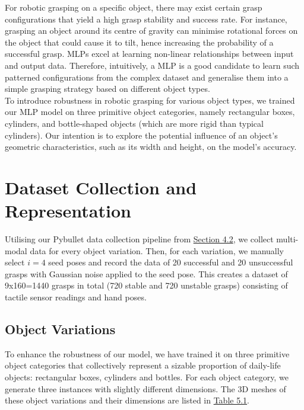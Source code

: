 \documentclass[11pt, a4paper]{report}
\begin{document}
For robotic grasping on a specific object, there may exist certain grasp configurations that yield a high grasp stability and success rate. For instance, grasping an object around its centre of gravity can minimise rotational forces on the object that could cause it to tilt, hence increasing the probability of a successful grasp. MLPs excel at learning non-linear relationships between input and output data. Therefore, intuitively, a MLP is a good candidate to learn such patterned configurations from the complex dataset and generalise them into a simple grasping strategy based on different object types.\\

To introduce robustness in robotic grasping for various object types, we trained our MLP model on three primitive object categories, namely rectangular boxes, cylinders, and bottle-shaped objects (which are more rigid than typical cylinders). Our intention is to explore the potential influence of an object's geometric characteristics, such as its width and height, on the model's accuracy.


\section{Dataset Collection and Representation}
\label{sec:5.2}
Utilising our Pybullet data collection pipeline from \hyperref[sec:4.2]{Section 4.2}, we collect multi-modal data for every object variation. Then, for each variation, we manually select $i=4$ seed poses and record the data of 20 successful and 20 unsuccessful grasps with Gaussian noise applied to the seed pose. This creates a dataset of 9x160=1440 grasps in total (720 stable and 720 unstable grasps) consisting of tactile sensor readings and hand poses.


\subsection{Object Variations}
\label{sec:5.2.1}
To enhance the robustness of our model, we have trained it on three primitive object categories that collectively represent a sizable proportion of daily-life objects: rectangular boxes, cylinders and bottles. For each object category, we generate three instances with slightly different dimensions. The 3D meshes of these object variations and their dimensions are listed in \hyperref[tbl:5.1]{Table 5.1}.
\end{document}
